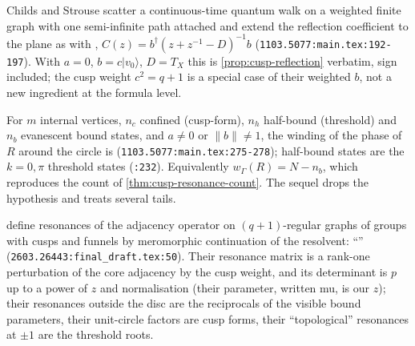 \begin{citedfact}
\label{cit:childs-strouse-reflection}
Childs and Strouse \cite{childs2011levinson} scatter a continuous-time quantum walk on a weighted finite
graph with one semi-infinite path attached and extend the reflection coefficient to the plane as
\texttt{} with
\texttt{}, $C(z) = b^\dagger(z+z^{-1}-D)^{-1}b$
(\texttt{1103.5077:main.tex:192-197}). With $a = 0$, $b = c|v_0\rangle$, $D = T_X$ this is
\cref{prop:cusp-reflection} verbatim, sign included; the cusp weight $c^2 = q+1$ is a special case of
their weighted $b$, not a new ingredient at the formula level.
\end{citedfact}

\begin{citedfact}
\label{cit:childs-strouse-levinson}
For $m$ internal vertices, $n_c$ confined (cusp-form), $n_h$ half-bound (threshold) and $n_b$ evanescent
bound states, and $a\ne0$ or $\|b\|\ne1$, the winding of the phase of $R$ around the circle is
\texttt{} (\texttt{1103.5077:main.tex:275-278});
half-bound states are the $k = 0,\pi$ threshold states (\texttt{:232}). Equivalently
$w_\Gamma(R) = N - n_b$, which reproduces the count of \cref{thm:cusp-resonance-count}. The sequel
\cite{childs2012levinson} drops the hypothesis and treats several tails.
\end{citedfact}

\begin{citedfact}
\label{cit:apw-resonances}
\cite{arends2026resonances} define resonances of the adjacency operator on $(q+1)$-regular graphs of
groups with cusps and funnels by meromorphic continuation of the resolvent: ``\texttt{}''
(\texttt{2603.26443:final\_draft.tex:50}). Their resonance matrix is a rank-one perturbation of the core
adjacency by the cusp weight, and its determinant is $p$ up to a power of $z$ and normalisation (their parameter, written mu, is our $z$);
their resonances outside the disc are the reciprocals of the visible bound parameters, their unit-circle
factors are cusp forms, their ``topological'' resonances at $\pm1$ are the threshold roots.
\end{citedfact}


